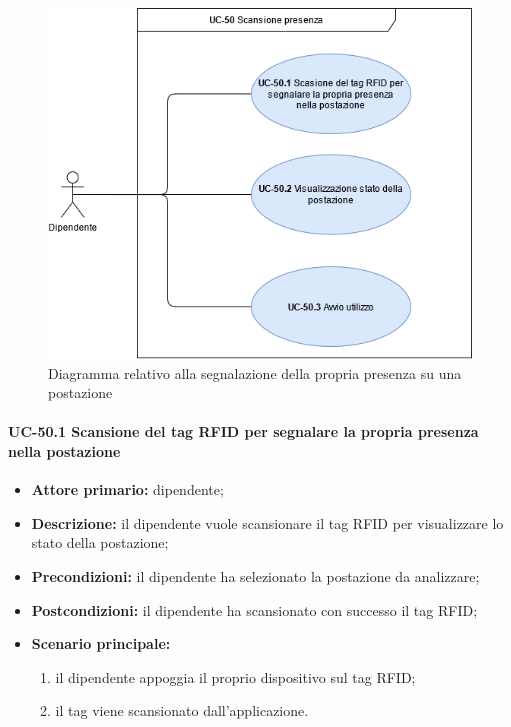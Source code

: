     \begin{figure}[H]
		\centering
		  \includegraphics[scale=0.50]{src/CasiDUso/immagini/ScansionePresenza.png}
		\caption{Diagramma relativo alla segnalazione della propria presenza su una postazione}
	\end{figure}


\paragraph{UC-50.1 Scansione del tag RFID per segnalare la propria presenza nella postazione}
   
    \begin{itemize}
        \item \textbf{Attore primario:} dipendente;

        \item \textbf{Descrizione:} il dipendente vuole scansionare il tag RFID per visualizzare lo stato della postazione;

        \item \textbf{Precondizioni:} il dipendente ha selezionato la postazione da analizzare;

        \item \textbf{Postcondizioni:} il dipendente ha scansionato con successo il tag RFID;

        \item \textbf{Scenario principale:}
            \begin{enumerate}
                \item il dipendente appoggia il proprio dispositivo sul tag RFID;
                \item il tag viene scansionato dall'applicazione.
            \end{enumerate}
    \end{itemize}

